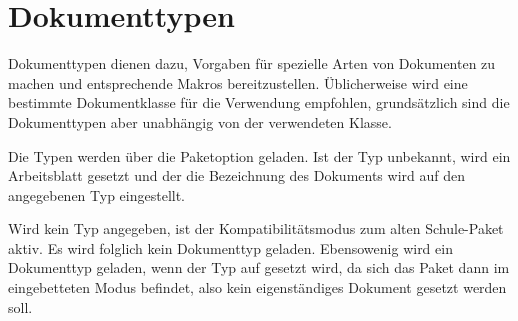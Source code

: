\part{Dokumenttypen}
	\label{sec:typen}
	Dokumenttypen dienen dazu, Vorgaben für spezielle Arten von
	Dokumenten zu machen und entsprechende Makros bereitzustellen.
	Üblicherweise wird eine bestimmte Dokumentklasse für die
	Verwendung empfohlen, grundsätzlich sind die Dokumenttypen aber
	unabhängig von der verwendeten Klasse.

	Die Typen werden über die Paketoption  geladen.
	Ist der Typ unbekannt, wird ein Arbeitsblatt gesetzt und der
	die Bezeichnung des Dokuments wird auf den angegebenen Typ
	eingestellt.

	Wird kein Typ angegeben, ist der Kompatibilitätsmodus zum
	alten Schule-Paket aktiv. Es wird folglich kein Dokumenttyp
	geladen.
	Ebensowenig wird ein Dokumenttyp geladen, wenn der Typ auf
	 gesetzt wird, da sich das Paket dann im
	eingebetteten Modus befindet, also kein eigenständiges
	Dokument gesetzt werden soll.

	
%	
	
%	
    
%	
	
	
    
    
